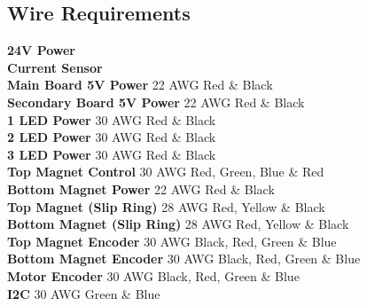 \documentclass{article}
\begin{document}
\subsection{Wire Requirements}
\textbf{24V Power}\\
\textbf{Current Sensor}\\
\textbf{Main Board 5V Power} 22 AWG Red \& Black\\
\textbf{Secondary Board 5V Power} 22 AWG Red \& Black\\
\textbf{1 LED Power} 30 AWG Red \& Black\\
\textbf{2 LED Power} 30 AWG Red \& Black\\
\textbf{3 LED Power} 30 AWG Red \& Black\\
\textbf{Top Magnet Control} 30 AWG Red, Green, Blue \& Red\\
\textbf{Bottom Magnet Power} 22 AWG Red \& Black\\
\textbf{Top Magnet (Slip Ring)} 28 AWG Red, Yellow \& Black\\
\textbf{Bottom Magnet (Slip Ring)} 28 AWG Red, Yellow \& Black\\
\textbf{Top Magnet Encoder} 30 AWG Black, Red, Green \& Blue\\
\textbf{Bottom Magnet Encoder} 30 AWG Black, Red, Green \& Blue\\
\textbf{Motor Encoder} 30 AWG Black, Red, Green \& Blue\\
\textbf{I2C} 30 AWG Green \& Blue\\

\newpage
\end{document}
